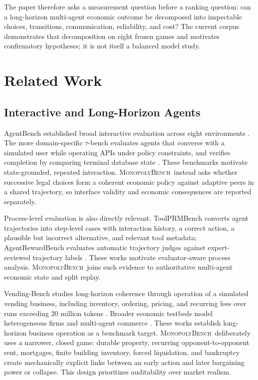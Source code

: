 \documentclass[conference]{IEEEtran}
\newcommand{\Bench}{\textsc{MonopolyBench}}
\begin{document}
The paper therefore asks a measurement question before a ranking question:
can a long-horizon multi-agent economic outcome be decomposed into inspectable
choices, transitions, communication, reliability, and cost? The current corpus
demonstrates that decomposition on eight frozen games and motivates
confirmatory hypotheses; it is not itself a balanced model study.

\section{Related Work}
\label{sec:related}

\subsection{Interactive and Long-Horizon Agents}

AgentBench established broad interactive evaluation across eight environments
\cite{agentbench}. The more domain-specific $\tau$-bench evaluates agents
that converse with a simulated user while operating APIs under policy
constraints, and verifies completion by comparing terminal database state
\cite{taubench}. These benchmarks motivate state-grounded, repeated
interaction. \Bench\ instead asks whether successive legal choices form a
coherent economic policy against adaptive peers in a shared trajectory, so
interface validity and economic consequences are reported separately.

Process-level evaluation is also directly relevant. ToolPRMBench converts
agent trajectories into step-level cases with interaction history, a correct
action, a plausible but incorrect alternative, and relevant tool metadata;
AgentRewardBench evaluates automatic trajectory judges against expert-reviewed
trajectory labels
\cite{toolprmbench,agentrewardbench}. These works motivate evaluator-aware
process analysis. \Bench\ joins such evidence to authoritative multi-agent
economic state and split replay.

Vending-Bench studies long-horizon coherence through operation of a simulated
vending business, including inventory, ordering, pricing, and recurring fees
over runs exceeding 20 million tokens \cite{vendingbench}. Broader economic
testbeds model heterogeneous firms and multi-agent commerce
\cite{coffeebench}. These works establish long-horizon business operation as
a benchmark target. \Bench\ deliberately uses a narrower, closed game:
durable property, recurring opponent-to-opponent rent, mortgages, finite
building inventory, forced liquidation, and bankruptcy create mechanically
explicit links between an early action and later bargaining power or collapse.
This design prioritizes auditability over market realism.
\end{document}
